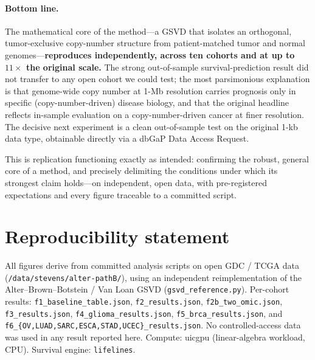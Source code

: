 \documentclass[11pt]{article}
\begin{document}
\paragraph{Bottom line.}
The mathematical core of the method---a GSVD that isolates an orthogonal,
tumor-exclusive copy-number structure from patient-matched tumor and normal
genomes---\textbf{reproduces independently, across ten cohorts and at up to
$11\times$ the original scale.} The strong out-of-sample survival-prediction
result did not transfer to any open cohort we could test; the most parsimonious
explanation is that genome-wide copy number at 1-Mb resolution carries prognosis
only in specific (copy-number-driven) disease biology, and that the original
headline reflects in-sample evaluation on a copy-number-driven cancer at finer
resolution. The decisive next experiment is a clean out-of-sample test on the
original 1-kb data type, obtainable directly via a dbGaP Data Access Request.

This is replication functioning exactly as intended: confirming the robust,
general core of a method, and precisely delimiting the conditions under which its
strongest claim holds---on independent, open data, with pre-registered
expectations and every figure traceable to a committed script.

\section*{Reproducibility statement}
All figures derive from committed analysis scripts on open GDC / TCGA data
(\texttt{/data/stevens/alter-pathB/}), using an independent reimplementation of
the Alter--Brown--Botstein / Van Loan GSVD (\texttt{gsvd\_reference.py}).
Per-cohort results: \texttt{f1\_baseline\_table.json}, \texttt{f2\_results.json},
\texttt{f2b\_two\_omic.json}, \texttt{f3\_results.json},
\texttt{f4\_glioma\_results.json}, \texttt{f5\_brca\_results.json}, and
\texttt{f6\_\{OV,LUAD,SARC,ESCA,STAD,UCEC\}\_results.json}. No controlled-access
data was used in any result reported here. Compute: uicgpu (linear-algebra
workload, CPU). Survival engine: \texttt{lifelines}.
\end{document}
